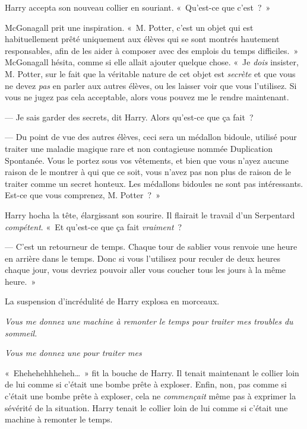 Harry accepta son nouveau collier en souriant.
«~Qu'est-ce que c'est~?~»

McGonagall prit une inspiration.
«~M. Potter, c'est un objet qui est habituellement prêté uniquement aux élèves qui se sont montrés hautement responsables, afin de les aider à composer avec des emplois du temps difficiles.~»
McGonagall hésita, comme si elle allait ajouter quelque chose.
«~Je \emph{dois} insister, M. Potter, sur le fait que la véritable nature de cet objet est \emph{secrète} et que vous ne devez \emph{pas} en parler aux autres élèves, ou les laisser voir que vous l'utilisez.
Si vous ne jugez pas cela acceptable, alors vous pouvez me le rendre maintenant.

--- Je sais garder des secrets, dit Harry. Alors qu'est-ce que ça fait~?

--- Du point de vue des autres élèves, ceci sera un médallon bidoule, utilisé pour traiter une maladie magique rare et non contagieuse nommée Duplication Spontanée.
Vous le portez sous vos vêtements, et bien que vous n'ayez aucune raison de le montrer à qui que ce soit, vous n'avez pas non plus de raison de le traiter comme un secret honteux.
Les médallons bidoules ne sont pas intéressants.
Est-ce que vous comprenez, M. Potter~?~»

Harry hocha la tête, élargissant son sourire.
Il flairait le travail d'un Serpentard \emph{compétent}.
«~Et qu'est-ce que ça fait \emph{vraiment}~?

--- C'est un retourneur de temps.
Chaque tour de sablier vous renvoie une heure en arrière dans le temps.
Donc si vous l'utilisez pour reculer de deux heures chaque jour, vous devriez pouvoir aller vous coucher tous les jours à la même heure.~»

La suspension d'incrédulité de Harry explosa en morceaux.

\emph{Vous me donnez une machine à remonter le temps pour traiter mes troubles du sommeil.}

\emph{Vous me donnez une  pour traiter mes }


«~Ehehehehhheheh…~» fit la bouche de Harry.
Il tenait maintenant le collier loin de lui comme si c'était une bombe prête à exploser.
Enfin, non, pas comme si c'était une bombe prête à exploser, cela ne \emph{commençait} même pas à exprimer la sévérité de la situation.
Harry tenait le collier loin de lui comme si c'était une machine à remonter le temps.

